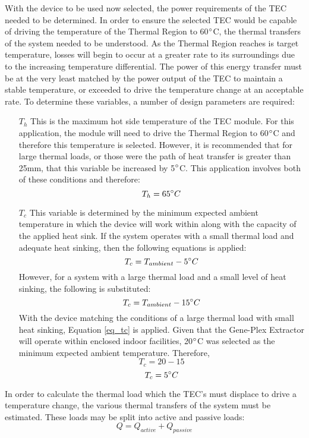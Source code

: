 With the device to be used now selected, the power requirements of the TEC needed to be determined. In order to ensure the selected TEC would be capable of driving the temperature of the Thermal Region to 60$\degree$C, the thermal transfers of the system needed to be understood. As the Thermal Region reaches is target temperature, losses will begin to occur at a greater rate to its surroundings due to the increasing temperature differential. The power of this energy transfer must be at the very least matched by the power output of the TEC to maintain a stable temperature, or exceeded to drive the temperature change at an acceptable rate. To determine these variables, a number of design parameters are required:
\begin{enumerate}
	\item [$T_h$] This is the maximum hot side temperature of the TEC module. For this application, the module will need to drive the Thermal Region to 60$\degree$C and therefore this temperature is selected. However, it is recommended that for large thermal loads, or those were the path of heat transfer is greater than 25mm, that this variable be increased by 5$\degree$C. This application involves both of these conditions and therefore:
	$$T_h = 65\degree C$$
	\item[$T_c$] This variable is determined by the minimum expected ambient temperature in which the device will work within along with the capacity of the applied heat sink. If the system operates with a small thermal load and adequate heat sinking, then the following equations is applied:
	\begin{equation}
	T_c = T_{ambient} - 5\degree C
	\end{equation}
	However, for a system with a large thermal load and a small level of heat sinking, the following is substituted:
	\begin{equation}
	\label{eq_tc}
	T_c = T_{ambient} - 15\degree C
	\end{equation}
	With the device matching the conditions of a large thermal load with small heat sinking, Equation \ref{eq_tc} is applied. Given that the Gene-Plex Extractor will operate within enclosed indoor facilities, 20$\degree$C was selected as the minimum expected ambient temperature. Therefore,
	$$ T_c = 20 - 15$$
	$$ T_c = 5\degree C $$
\end{enumerate}

In order to calculate the thermal load which the TEC's must displace to drive a temperature change, the various thermal transfers of the system must be estimated. These loads may be split into active and passive loads:
\begin{equation}
\label{eq_thermalload}
Q = Q_{active} + Q_{passive}
\end{equation}

